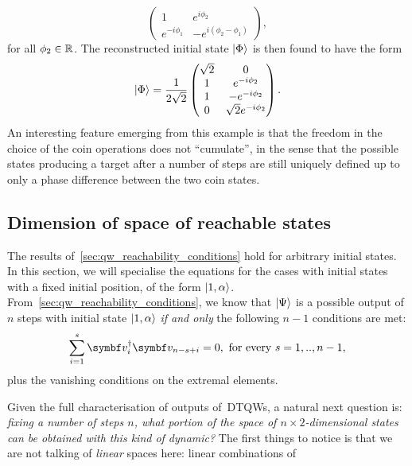 \begin{example}[label=ex:qw_conditions_few_steps]
\begin{equation}
\begin{pmatrix}
            1 & e^{i\phi_2} \\
            e^{-i\phi_1} & -e^{i(\phi_2-\phi_1)}
        \end{pmatrix},
    \end{equation}
    for all $\phi_2\in\mathbb{R}$. The reconstructed initial state $\ket\Phi$ is then found to have the form
    \begin{equation}
        \ket\Phi = \frac{1}{2\sqrt2}
        \begin{pmatrix}
            \sqrt2 & 0 \\
            1 & e^{-i\phi_2} \\
            1 & -e^{-i\phi_2} \\
            0 & \sqrt2 e^{-i\phi_2}
        \end{pmatrix}.
    \end{equation}
    An interesting feature emerging from this example is that the freedom in the choice of the coin operations does not ``cumulate'', in the sense that the possible states producing a target after a number of steps are still uniquely defined up to only a phase difference between the two coin states.
\end{example}

\subsection{Dimension of space of reachable states}
\label{sec:qw_reachable_space}

The results of~\cref{sec:qw_reachability_conditions} hold for arbitrary initial states. In this section, we will specialise the equations for the cases with initial states with a fixed initial position, of the form $\ket{1,\alpha}$.
From~\cref{sec:qw_reachability_conditions}, we know that $\ket{\Psi}$ is a possible output of $n$ steps with initial state $\ket{1,\alpha}$ \textit{if and only} the following $n-1$ conditions are met:
\begin{equation}
	\sum_{i=1}^s \bs v_i^{\dagger} \bs v_{n-s+i} = 0,
	\text{ for every } s=1,..,n-1,
	\label{eq:qw_general_reachability_conditions}
\end{equation}
plus the vanishing conditions on the extremal elements.

Given the full characterisation of outputs of~\acp{DTQW}, a natural next question is: \textit{fixing a number of steps $n$, what portion of the space of $n\times 2$-dimensional states can be obtained with this kind of dynamic?}
The first things to notice is that we are not talking of \textit{linear} spaces here: linear combinations of 

